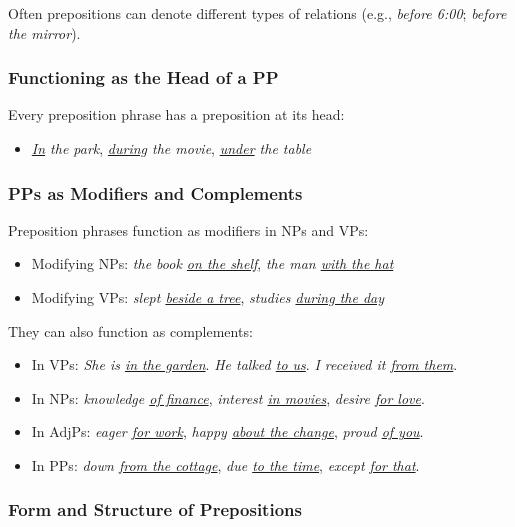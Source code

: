 \noindent Often prepositions can denote different types of relations (e.g., \textit{before 6:00}; \textit{before the mirror}).

\subsubsection*{Functioning as the Head of a PP}

Every preposition phrase has a preposition at its head:

\begin{itemize}
    \item \textit{\uline{In} the park}, \textit{\uline{during} the movie}, \textit{\uline{under} the table}
\end{itemize}

\subsubsection*{PPs as Modifiers and Complements}

Preposition phrases function as modifiers in NPs and VPs:

\begin{itemize}
    \item Modifying NPs: \textit{the book \uline{on the shelf}}, \textit{the man \uline{with the hat}}
    \item Modifying VPs: \textit{slept \uline{beside a tree}}, \textit{studies \uline{during the day}}
\end{itemize}

They can also function as complements:

\begin{itemize}
    \item In VPs: \textit{She is \uline{in the garden}}. \textit{He talked \uline{to us}}. \textit{I received it \uline{from them}}. 
    \item In NPs: \textit{knowledge \uline{of finance}}, \textit{interest \uline{in movies}}, \textit{desire \uline{for love}}.
    \item In AdjPs: \textit{eager \uline{for work}}, \textit{happy \uline{about the change}}, \textit{proud \uline{of you}}.
    \item In PPs: \textit{down \uline{from the cottage}}, \textit{due \uline{to the time}}, \textit{except \uline{for that}}.
\end{itemize}

\subsubsection*{Form and Structure of Prepositions}

